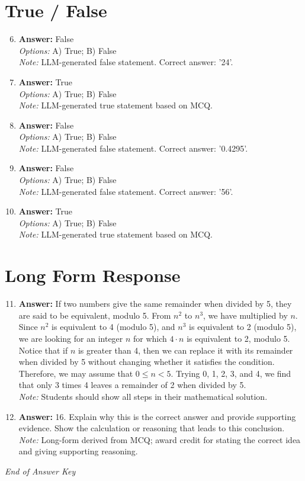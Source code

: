 \documentclass[12pt]{article}
\begin{document}
\section*{True / False}
\begin{enumerate}[label=\arabic*.]
\setcounter{enumi}{5}
\item \textbf{Answer:} False
\\ \textit{Options:} A) True; B) False
\\ \textit{Note:} LLM-generated false statement. Correct answer: '24'.
\item \textbf{Answer:} True
\\ \textit{Options:} A) True; B) False
\\ \textit{Note:} LLM-generated true statement based on MCQ.
\item \textbf{Answer:} False
\\ \textit{Options:} A) True; B) False
\\ \textit{Note:} LLM-generated false statement. Correct answer: '0.4295'.
\item \textbf{Answer:} False
\\ \textit{Options:} A) True; B) False
\\ \textit{Note:} LLM-generated false statement. Correct answer: '56'.
\item \textbf{Answer:} True
\\ \textit{Options:} A) True; B) False
\\ \textit{Note:} LLM-generated true statement based on MCQ.
\end{enumerate}

\section*{Long Form Response}
\begin{enumerate}[label=\arabic*.]
\setcounter{enumi}{10}
\item \textbf{Answer:} If two numbers give the same remainder when divided by 5, they are said to be equivalent, modulo 5. From $n^2$ to $n^3$, we have multiplied by $n$. Since $n^2$ is equivalent to 4 (modulo 5), and $n^3$ is equivalent to 2 (modulo 5), we are looking for an integer $n$ for which $4\cdot n$ is equivalent to 2, modulo 5. Notice that if $n$ is greater than 4, then we can replace it with its remainder when divided by 5 without changing whether it satisfies the condition. Therefore, we may assume that $0\leq n <5$. Trying 0, 1, 2, 3, and 4, we find that only $\boxed{3}$ times 4 leaves a remainder of 2 when divided by 5.
\\ \textit{Note:} Students should show all steps in their mathematical solution.
\item \textbf{Answer:} 16. Explain why this is the correct answer and provide supporting evidence. Show the calculation or reasoning that leads to this conclusion.
\\ \textit{Note:} Long-form derived from MCQ; award credit for stating the correct idea and giving supporting reasoning.
\end{enumerate}

\vfill
\noindent\textit{End of Answer Key}
\end{document}
